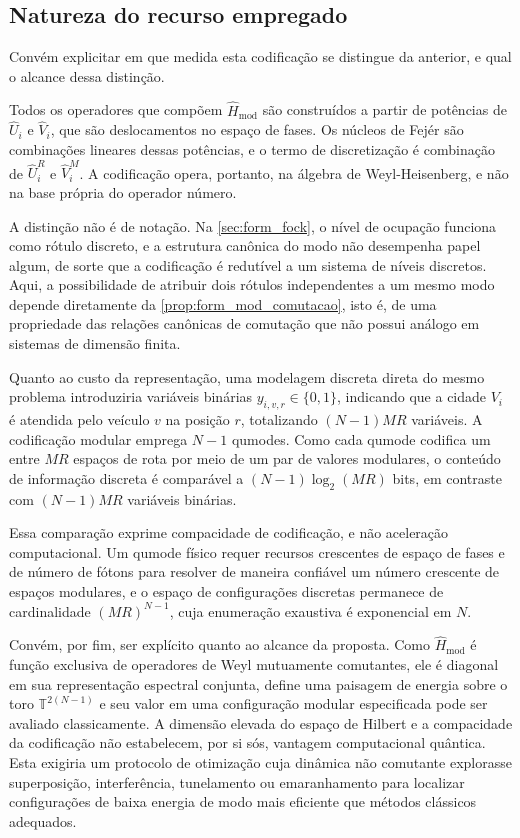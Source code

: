     \subsection{Natureza do recurso empregado}\label{subsec:form_mod_recurso}

        Convém explicitar em que medida esta codificação se distingue da anterior, e qual o alcance dessa distinção.

        Todos os operadores que compõem $\hat{H}_{\text{mod}}$ são construídos a partir de potências de $\hat{U}_i$ e $\hat{V}_i$, que são deslocamentos no espaço de fases. Os núcleos de Fejér são combinações lineares dessas potências, e o termo de discretização é combinação de $\hat{U}_i^{R}$ e $\hat{V}_i^{M}$. A codificação opera, portanto, na álgebra de Weyl-Heisenberg, e não na base própria do operador número.

        A distinção não é de notação. Na \autoref{sec:form_fock}, o nível de ocupação funciona como rótulo discreto, e a estrutura canônica do modo não desempenha papel algum, de sorte que a codificação é redutível a um sistema de níveis discretos. Aqui, a possibilidade de atribuir dois rótulos independentes a um mesmo modo depende diretamente da \autoref{prop:form_mod_comutacao}, isto é, de uma propriedade das relações canônicas de comutação que não possui análogo em sistemas de dimensão finita.

        Quanto ao custo da representação, uma modelagem discreta direta do mesmo problema introduziria variáveis binárias $y_{i,v,r} \in \{0,1\}$, indicando que a cidade $V_i$ é atendida pelo veículo $v$ na posição $r$, totalizando $(N-1)MR$ variáveis. A codificação modular emprega $N-1$ qumodes. Como cada qumode codifica um entre $MR$ espaços de rota por meio de um par de valores modulares, o conteúdo de informação discreta é comparável a $(N-1)\log_2(MR)$ bits, em contraste com $(N-1)MR$ variáveis binárias.

        Essa comparação exprime compacidade de codificação, e não aceleração computacional. Um qumode físico requer recursos crescentes de espaço de fases e de número de fótons para resolver de maneira confiável um número crescente de espaços modulares, e o espaço de configurações discretas permanece de cardinalidade $(MR)^{N-1}$, cuja enumeração exaustiva é exponencial em $N$.

        Convém, por fim, ser explícito quanto ao alcance da proposta. Como $\hat{H}_{\text{mod}}$ é função exclusiva de operadores de Weyl mutuamente comutantes, ele é diagonal em sua representação espectral conjunta, define uma paisagem de energia sobre o toro $\mathbb{T}^{2(N-1)}$ e seu valor em uma configuração modular especificada pode ser avaliado classicamente. A dimensão elevada do espaço de Hilbert e a compacidade da codificação não estabelecem, por si sós, vantagem computacional quântica. Esta exigiria um protocolo de otimização cuja dinâmica não comutante explorasse superposição, interferência, tunelamento ou emaranhamento para localizar configurações de baixa energia de modo mais eficiente que métodos clássicos adequados.

